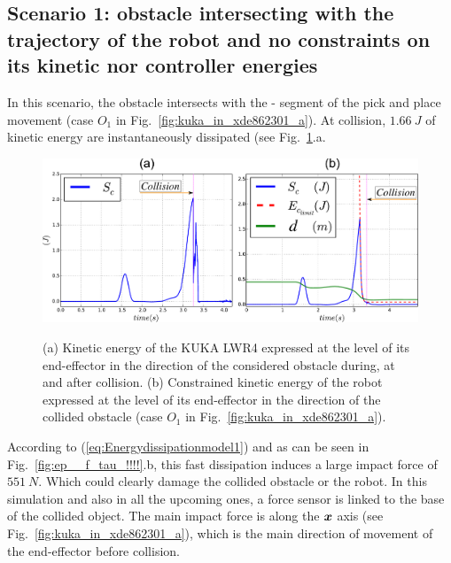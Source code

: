\documentclass[letterpaper, 10 pt, conference]{ieeeconf}      %
\newcommand*\circled[1]{\tikz[baseline=(char.base)]{
            \node[shape=circle,draw,inner sep=0.5pt] (char) {#1};}}
\newcommand{\vect}[1]{\mbox{\boldmath${#1}$}}%
\begin{document}
\subsection{Scenario 1: obstacle intersecting with the trajectory of the robot and no constraints on its kinetic nor controller energies} \label{subsec_no_constr_energy}
In this scenario, the obstacle intersects with the \circled{2}-\circled{3} segment of the pick and place movement (case $O_1$ in Fig.~\ref{fig:kuka_in_xde862301_a}). At collision, $1.66~J$ of kinetic energy are instantaneously dissipated (see Fig.~\ref{fig:ec_obst3!!!!}.a. 
\begin{figure}[!htbp]
\centering
{\includegraphics[width=1\columnwidth]{figures/ec_obst35!!!!}}
\caption{(a) Kinetic energy of the KUKA LWR4 expressed at the level of its end-effector in the direction of the considered obstacle during, at and after collision. (b) Constrained kinetic energy of the robot expressed at the level of its end-effector in the direction of the collided obstacle (case $O_1$ in Fig.~\ref{fig:kuka_in_xde862301_a}).} 
\label{fig:ec_obst3!!!!}
\end{figure}
According to (\ref{eq:Energydissipationmodel1}) and as can be seen in  Fig.~\ref{fig:ep__f_tau_!!!!}.b, this fast dissipation induces a large impact force of $551~N$. Which could clearly damage the collided obstacle or the robot. In this simulation and also in all the upcoming ones, a force sensor is linked to the base of the collided object. The main impact force is along the $\vect{x}$ axis (see Fig.~\ref{fig:kuka_in_xde862301_a}), which is the main direction of movement of the end-effector before collision.
\end{document}
